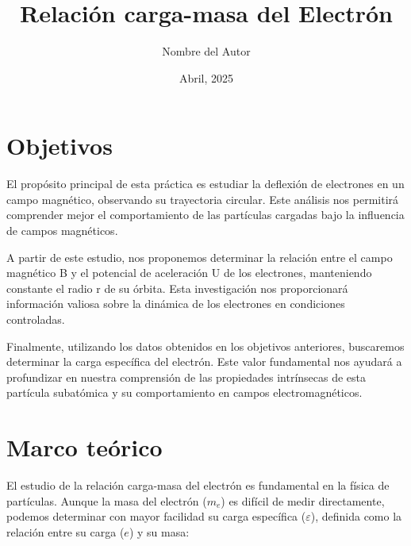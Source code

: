 \documentclass[twocolumn,a4paper,11pt]{scrartcl}
\title{Relación carga-masa del Electrón}
\author{Nombre del Autor}
\date{Abril, 2025}
\begin{document}

\section{Objetivos}

El propósito principal de esta práctica es estudiar la deflexión de electrones en un campo magnético, observando su trayectoria circular. Este análisis nos permitirá comprender mejor el comportamiento de las partículas cargadas bajo la influencia de campos magnéticos.

A partir de este estudio, nos proponemos determinar la relación entre el campo magnético B y el potencial de aceleración U de los electrones, manteniendo constante el radio r de su órbita. Esta investigación nos proporcionará información valiosa sobre la dinámica de los electrones en condiciones controladas.

Finalmente, utilizando los datos obtenidos en los objetivos anteriores, buscaremos determinar la carga específica del electrón. Este valor fundamental nos ayudará a profundizar en nuestra comprensión de las propiedades intrínsecas de esta partícula subatómica y su comportamiento en campos electromagnéticos.

\section{Marco teórico}

El estudio de la relación carga-masa del electrón es fundamental en la física de partículas. Aunque la masa del electrón ($m_e$) es difícil de medir directamente, podemos determinar con mayor facilidad su carga específica ($\varepsilon$), definida como la relación entre su carga ($e$) y su masa:
\end{document}
